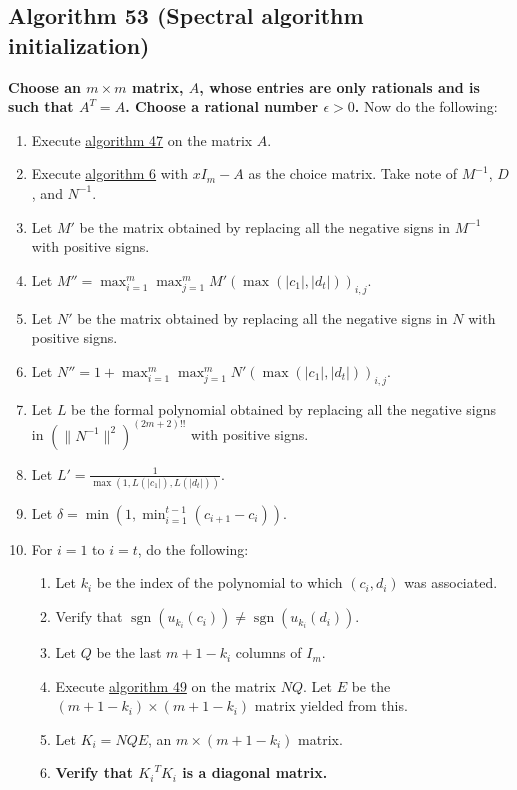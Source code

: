 \documentclass[twocolumn]{article}
\DeclareMathOperator{\sgn}{sgn}
\begin{document}
		\subsection{Algorithm 53 (Spectral algorithm initialization)}\label{sec:algorithm 53}
			\textbf{Choose an $m\times m$ matrix, $A$, whose entries are only rationals and is such that $A^T=A$. Choose a rational number $\epsilon>0$.} Now do the following:
			\begin{enumerate}
				\item Execute \hyperref[sec:algorithm 47]{algorithm 47} on the matrix $A$.
				\item Execute \hyperref[sec:algorithm 6]{algorithm 6} with $xI_m-A$ as the choice matrix. Take note of $M^{-1}$, $D$, and $N^{-1}$.
				\item Let $M'$ be the matrix obtained by replacing all the negative signs in $M^{-1}$ with positive signs.
				\item Let $M''=\max_{i=1}^m\max_{j=1}^mM'(\max(\lvert c_1\rvert,\lvert d_t\rvert))_{i,j}$.
				\item Let $N'$ be the matrix obtained by replacing all the negative signs in $N$ with positive signs.
				\item Let $N''=1+\max_{i=1}^m\max_{j=1}^mN'(\max(\lvert c_1\rvert,\lvert d_t\rvert))_{i,j}$.
				\item Let $L$ be the formal polynomial obtained by replacing all the negative signs in $(\lVert N^{-1}\rVert^2)^{(2m+2)!!}$ with positive signs.
				\item Let $L'=\frac{1}{\max(1,L(\lvert c_1\rvert),L(\lvert d_t\rvert))}$.
				\item Let $\delta=\min(1,\min_{i=1}^{t-1}(c_{i+1}-c_i))$.
				\item For $i=1$ to $i=t$, do the following:
				\begin{enumerate}
					\item Let $k_i$ be the index of the polynomial to which $(c_i, d_i)$ was associated.
					\item Verify that $\sgn(u_{k_i}(c_i))\ne\sgn(u_{k_i}(d_i))$.
					\item Let $Q$ be the last $m+1-k_i$ columns of $I_m$.
					\item Execute \hyperref[sec:algorithm 49]{algorithm 49} on the matrix $NQ$. Let $E$ be the $(m+1-k_i)\times (m+1-k_i)$ matrix yielded from this.
					\item Let $K_i=NQE$, an $m\times(m+1-k_i)$ matrix.
					\item \textbf{Verify that ${K_i}^T{K_i}$ is a diagonal matrix.}

\end{enumerate}
\end{enumerate}
\end{document}
